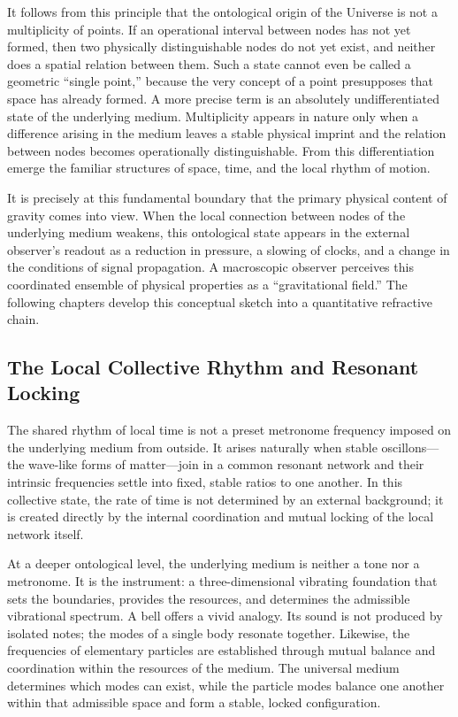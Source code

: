 \documentclass[11pt,a4paper]{article}
\begin{document}
It follows from this principle that the ontological origin of the Universe is not a multiplicity of points. If an operational interval between nodes has not yet formed, then two physically distinguishable nodes do not yet exist, and neither does a spatial relation between them. Such a state cannot even be called a geometric ``single point,'' because the very concept of a point presupposes that space has already formed. A more precise term is an absolutely undifferentiated state of the underlying medium. Multiplicity appears in nature only when a difference arising in the medium leaves a stable physical imprint and the relation between nodes becomes operationally distinguishable. From this differentiation emerge the familiar structures of space, time, and the local rhythm of motion.

It is precisely at this fundamental boundary that the primary physical content of gravity comes into view. When the local connection between nodes of the underlying medium weakens, this ontological state appears in the external observer's readout as a reduction in pressure, a slowing of clocks, and a change in the conditions of signal propagation. A macroscopic observer perceives this coordinated ensemble of physical properties as a ``gravitational field.'' The following chapters develop this conceptual sketch into a quantitative refractive chain.

\subsection{The Local Collective Rhythm and Resonant Locking}

The shared rhythm of local time is not a preset metronome frequency imposed on the underlying medium from outside. It arises naturally when stable oscillons---the wave-like forms of matter---join in a common resonant network and their intrinsic frequencies settle into fixed, stable ratios to one another. In this collective state, the rate of time is not determined by an external background; it is created directly by the internal coordination and mutual locking of the local network itself.

At a deeper ontological level, the underlying medium is neither a tone nor a metronome. It is the instrument: a three-dimensional vibrating foundation that sets the boundaries, provides the resources, and determines the admissible vibrational spectrum. A bell offers a vivid analogy. Its sound is not produced by isolated notes; the modes of a single body resonate together. Likewise, the frequencies of elementary particles are established through mutual balance and coordination within the resources of the medium. The universal medium determines which modes can exist, while the particle modes balance one another within that admissible space and form a stable, locked configuration.
\end{document}
